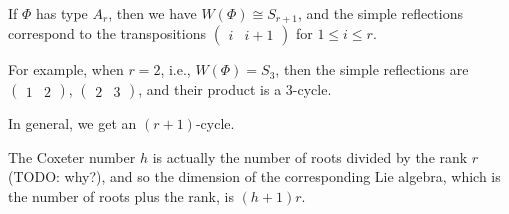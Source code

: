 If $\Phi$ has type $A_r$, then we have $W(\Phi) \cong S_{r+1}$, and the simple
reflections correspond to the transpositions $\begin{pmatrix}i & i + 1\end{pmatrix}$
for $1\leq i \leq r$.

For example, when $r = 2$, i.e., $W(\Phi) = S_3$, then the simple reflections
are $\begin{pmatrix}1&2\end{pmatrix}$, $\begin{pmatrix}2&3\end{pmatrix}$,
and their product is a $3$-cycle.

In general, we get an $(r+1)$-cycle.

The Coxeter number $h$ is actually the number of roots divided by the rank $r$
(TODO: why?), and so the dimension of the corresponding Lie algebra, which
is the number of roots plus the rank, is $(h+1)r$.
